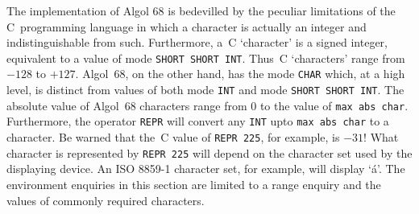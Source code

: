 The  implementation of Algol 68 is
bedevilled by the peculiar limitations of the C~programming language
in which a character is actually an integer and indistinguishable
from such. Furthermore, a~C `character' is a signed integer,
equivalent to a value of mode \verb|SHORT SHORT INT|. Thus~C
`characters' range from $-128$ to $+127$.  Algol~68, on the other
hand, has the mode \verb|CHAR| which, at a high level, is distinct
from values of both mode \verb|INT| and mode \verb|SHORT SHORT INT|.
The absolute value of Algol~68 characters range from $0$ to the value
of \verb|max abs char|. Furthermore, the operator \verb|REPR| will
convert any \verb|INT| upto \verb|max abs char| to a character. Be
warned that the~C value of \verb|REPR 225|, for example, is $-31$!
What character is represented by \verb|REPR 225| will depend on the
character set used by the displaying device. An ISO 8859-1 character
set, for example, will display `\'a'. The environment enquiries in
this section are limited to a range enquiry and the values of
commonly required characters.
